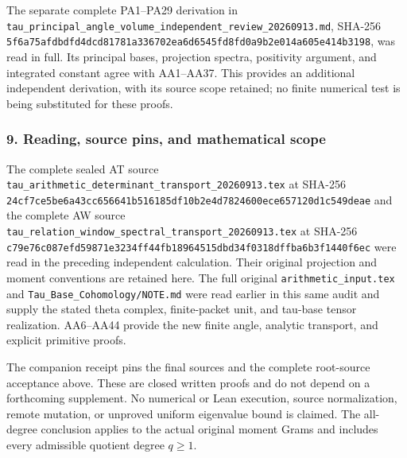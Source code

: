 The separate complete PA1--PA29 derivation in \nolinkurl{tau_principal_angle_volume_independent_review_20260913.md}, SHA-256 \nolinkurl{5f6a75afdbdfd4dcd81781a336702ea6d6545fd8fd0a9b2e014a605e414b3198}, was read in full. Its principal bases, projection spectra, positivity argument, and integrated constant agree with AA1--AA37. This provides an additional independent derivation, with its source scope retained; no finite numerical test is being substituted for these proofs.

\subsubsection{9. Reading, source pins, and mathematical scope}\label{endpoint-all_degree_angle_review--reading-source-pins-and-mathematical-scope}

The complete sealed AT source \nolinkurl{tau_arithmetic_determinant_transport_20260913.tex} at SHA-256 \nolinkurl{24cf7ce5be6a43cc656641b516185df10b2e4d7824600ece657120d1c549deae} and the complete AW source \nolinkurl{tau_relation_window_spectral_transport_20260913.tex} at SHA-256 \nolinkurl{c79e76c087efd59871e3234ff44fb18964515dbd34f0318dffba6b3f1440f6ec} were read in the preceding independent calculation. Their original projection and moment conventions are retained here. The full original \nolinkurl{arithmetic_input.tex} and \nolinkurl{Tau_Base_Cohomology/NOTE.md} were read earlier in this same audit and supply the stated theta complex, finite-packet unit, and tau-base tensor realization. AA6--AA44 provide the new finite angle, analytic transport, and explicit primitive proofs.

The companion receipt pins the final sources and the complete root-source acceptance above. These are closed written proofs and do not depend on a forthcoming supplement. No numerical or Lean execution, source normalization, remote mutation, or unproved uniform eigenvalue bound is claimed. The all-degree conclusion applies to the actual original moment Grams and includes every admissible quotient degree \(q\ge1\).

\endgroup


\endgroup
